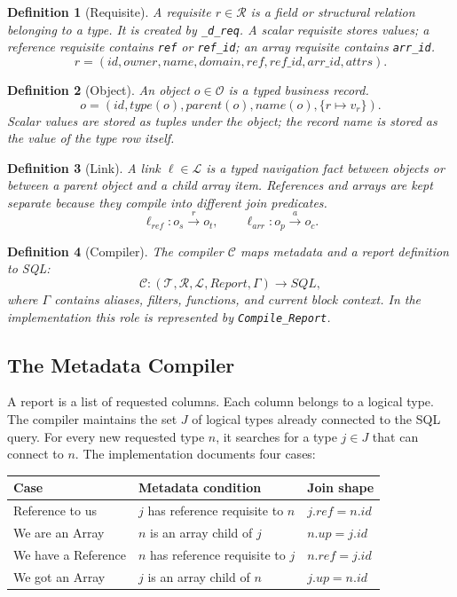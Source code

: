 \documentclass[11pt]{article}
\newtheorem{definition}{Definition}
\begin{document}
\begin{definition}[Requisite]
A requisite \(r \in \mathcal{R}\) is a field or structural relation belonging to
a type. It is created by \texttt{\_d\_req}. A scalar requisite stores values; a
reference requisite contains \texttt{ref} or \texttt{ref\_id}; an array
requisite contains \texttt{arr\_id}.
\[
  r = (id, owner, name, domain, ref, ref\_id, arr\_id, attrs).
\]
\end{definition}

\begin{definition}[Object]
An object \(o \in \mathcal{O}\) is a typed business record.
\[
  o = (id, type(o), parent(o), name(o), \{r \mapsto v_r\}).
\]
Scalar values are stored as tuples under the object; the record name is stored
as the value of the type row itself.
\end{definition}

\begin{definition}[Link]
A link \(\ell \in \mathcal{L}\) is a typed navigation fact between objects or
between a parent object and a child array item. References and arrays are kept
separate because they compile into different join predicates.
\[
  \ell_{ref}: o_s \xrightarrow{r} o_t,\qquad
  \ell_{arr}: o_p \xrightarrow{a} o_c.
\]
\end{definition}

\begin{definition}[Compiler]
The compiler \(\mathcal{C}\) maps metadata and a report definition to SQL:
\[
  \mathcal{C}: (\mathcal{T},\mathcal{R},\mathcal{L}, Report, \Gamma)
  \rightarrow SQL ,
\]
where \(\Gamma\) contains aliases, filters, functions, and current block
context. In the implementation this role is represented by
\texttt{Compile\_Report}.
\end{definition}

\subsection{The Metadata Compiler}

A report is a list of requested columns. Each column belongs to a logical type.
The compiler maintains the set \(J\) of logical types already connected to the
SQL query. For every new requested type \(n\), it searches for a type
\(j \in J\) that can connect to \(n\). The implementation documents four cases:

\begin{center}
\begin{tabular}{lll}
\toprule
Case & Metadata condition & Join shape \\
\midrule
Reference to us & \(j\) has reference requisite to \(n\) &
\(j.ref = n.id\) \\
We are an Array & \(n\) is an array child of \(j\) &
\(n.up = j.id\) \\
We have a Reference & \(n\) has reference requisite to \(j\) &
\(n.ref = j.id\) \\
We got an Array & \(j\) is an array child of \(n\) &
\(j.up = n.id\) \\
\bottomrule
\end{tabular}
\end{center}
\end{document}

